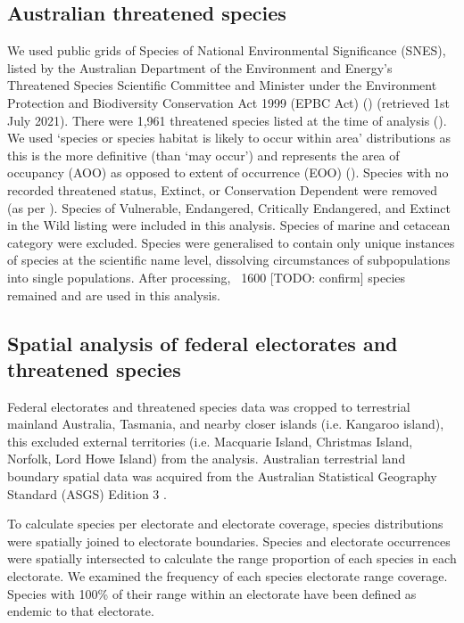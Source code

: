\documentclass[a4paper,11pt]{article}
\begin{document}
\subsection{Australian threatened species}

We used public grids of Species of National Environmental Significance (SNES), listed by the Australian Department of the Environment and Energy’s Threatened Species Scientific Committee and Minister under the Environment Protection and Biodiversity Conservation Act 1999 (EPBC Act) (\cite{commonwealthofaustraliaThreatenedSpeciesEPBC2021}) (retrieved 1st July 2021). There were 1,961 threatened species listed at the time of analysis (\cite{commonwealthofaustraliaThreatenedSpeciesEPBC2021}). We used ‘species or species habitat is likely to occur within area’ distributions as this is the more definitive (than ‘may occur’) and represents the area of occupancy (AOO) as opposed to extent of occurrence (EOO) (\cite{gastonSizesSpeciesGeographic2009, lloydEstimatingSpatialCoverage2020}). Species with no recorded threatened status, Extinct, or Conservation Dependent were removed (as per \cite{wardNationalscaleDatasetThreats}). Species of Vulnerable, Endangered, Critically Endangered, and Extinct in the Wild listing were included in this analysis. Species of marine and cetacean category were excluded. Species were generalised to contain only unique instances of species at the scientific name level, dissolving circumstances of subpopulations into single populations. After processing, ~1600 [TODO: confirm] species remained and are used in this analysis. 

\subsection{Spatial analysis of federal electorates and threatened species}

Federal electorates and threatened species data was cropped to terrestrial mainland Australia, Tasmania, and nearby closer islands (i.e. Kangaroo island), this excluded external territories (i.e. Macquarie Island, Christmas Island, Norfolk, Lord Howe Island) from the analysis. Australian terrestrial land boundary spatial data was acquired from the Australian Statistical Geography Standard (ASGS) Edition 3 \cite{australianbureauofstatisticsAustralianStatisticalGeography2021}. 

To calculate species per electorate and electorate coverage, species distributions were spatially joined to electorate boundaries. Species and electorate occurrences were spatially intersected to calculate the range proportion of each species in each electorate.
We examined the frequency of each species electorate range coverage.
Species with 100\% of their range within an electorate have been defined as endemic to that electorate. 
\end{document}
